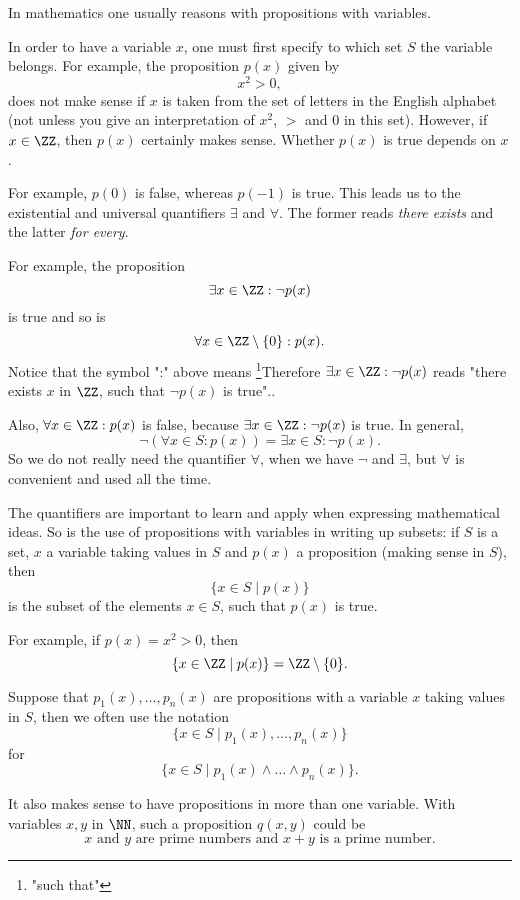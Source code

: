 \documentclass{article}
\begin{document}
In mathematics one usually reasons with propositions with variables.

In order to have a variable $x$, one must first specify to which set
$S$ the variable belongs. For example, the proposition $p(x)$ given by
$$
x^2 > 0,
$$
does not make sense if $x$ is taken from the set of letters in the
English alphabet (not unless you give an interpretation of $x^2$,
$>$ and $0$ in this set). However, if $x\in \ZZ$, then $p(x)$
certainly makes sense. Whether $p(x)$ is true depends on $x$.


For example, $p(0)$ is false, whereas $p(-1)$ is true. This leads us to
the existential and universal quantifiers $\exists$ and $\forall$.
The former reads \emph{there exists} and the latter \emph{for every}.

For example, the proposition
$$
\exists x\in \ZZ: \neg p(x)
$$
is true and so is
$$
\forall x\in \ZZ\setminus\{0\}: p(x).
$$
Notice that the  symbol ":" above means \footnote{"such that"}{Therefore  
$\exists x\in \ZZ: \neg p(x)$ reads "there exists $x$ in $\ZZ$, such that
$\neg p(x)$ is true".}.

Also, $\forall x\in \ZZ: p(x)$ is false, because
$\exists x\in \ZZ: \neg p(x)$ is true. In general,
$$
\neg\left(\forall x\in S: p(x)\right) = \exists x\in S: \neg p(x).
$$
So we do not really need the quantifier $\forall$, when we have
$\neg$ and $\exists$, but $\forall$ is convenient and used all
the time.

The quantifiers are important to learn and apply when expressing
mathematical ideas. So is the use of propositions with variables
in writing up subsets: if $S$ is a set, $x$ a variable taking values
in $S$ and $p(x)$ a proposition (making sense in $S$), then
$$
\{x\in S \mid p(x)\}
$$
is the subset of the elements $x\in S$, such that $p(x)$ is true.

For example, if $p(x) = x^2 > 0$, then
$$
\{x\in \ZZ \mid p(x)\} = \ZZ\setminus \{0\}.
$$

Suppose that $p_1(x), \dots, p_n(x)$ are propositions with a variable $x$ taking values
in $S$, then we often use the notation
$$
\{x\in S \mid p_1(x), \dots, p_n(x)\}
$$
for
$$
\{x\in S \mid p_1(x)\land \dots\land p_n(x)\}.
$$

\begin{remark}[emph]\label{remarkseveralvars}
  It also makes sense to have propositions in more than one variable. With
  variables $x, y$ in $\NN$, such a proposition $q(x, y)$ could be
  $$
  x\text{ and }y\text{ are prime numbers and } x + y \text{ is a prime number}.
  $$
\end{remark}
\end{document}
